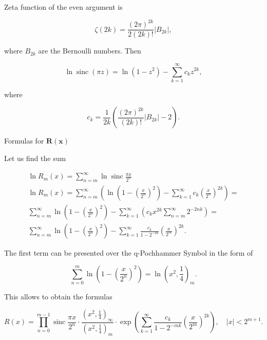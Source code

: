 \documentclass[10pt]{article}
\begin{document}
Zeta function of the even argument is


\begin{equation*}
\zeta(2 k)=\frac{(2 \pi)^{2 k}}{2(2 k)!}\left|B_{2 k}\right|, \tag{6}
\end{equation*}


where $B_{2 k}$ are the Bernoulli numbers. Then


\begin{equation*}
\ln \operatorname{sinc}(\pi z)=\ln \left(1-z^{2}\right)-\sum_{k=1}^{\infty} c_{k} z^{2 k}, \tag{7}
\end{equation*}


where


\begin{equation*}
c_{k}=\frac{1}{2 k}\left(\frac{(2 \pi)^{2 k}}{(2 k)!}\left|B_{2 k}\right|-2\right) . \tag{8}
\end{equation*}


Formulas for $\mathbf{R}(\mathbf{x})$

Let us find the sum

$$
\begin{gathered}
\ln R_{m}(x)=\sum_{n=m}^{\infty} \ln \operatorname{sinc} \frac{\pi x}{2^{n}} \\
\ln R_{m}(x)=\sum_{n=m}^{\infty}\left(\ln \left(1-\left(\frac{x}{2^{n}}\right)^{2}\right)-\sum_{k=1}^{\infty} c_{k}\left(\frac{x}{2^{n}}\right)^{2 k}\right)= \\
\sum_{n=m}^{\infty} \ln \left(1-\left(\frac{x}{2^{n}}\right)^{2}\right)-\sum_{k=1}^{\infty}\left(c_{k} x^{2 k} \sum_{n=m}^{\infty} 2^{-2 n k}\right)= \\
\sum_{n=m}^{\infty} \ln \left(1-\left(\frac{x}{2^{n}}\right)^{2}\right)-\sum_{k=1}^{\infty} \frac{c_{k}}{1-2^{-2 k}}\left(\frac{x}{2^{m}}\right)^{2 k} .
\end{gathered}
$$

The first term can be presented over the q-Pochhammer Symbol in the form of


\begin{equation*}
\sum_{n=0}^{m} \ln \left(1-\left(\frac{x}{2^{n}}\right)^{2}\right)=\ln \left(x^{2}, \frac{1}{4}\right)_{m} . \tag{9}
\end{equation*}


This allows to obtain the formulas


\begin{equation*}
R(x)=\prod_{n=0}^{m-1} \operatorname{sinc} \frac{\pi x}{2^{n}} \cdot \frac{\left(x^{2}, \frac{1}{4}\right)_{\infty}}{\left(x^{2}, \frac{1}{4}\right)_{m}} \cdot \exp \left(\sum_{k=1}^{\infty} \frac{c_{k}}{1-2^{-m k}}\left(\frac{x}{2^{m}}\right)^{2 k}\right), \quad|x|<2^{m+1} . \tag{(10}
\end{equation*}
\end{document}
